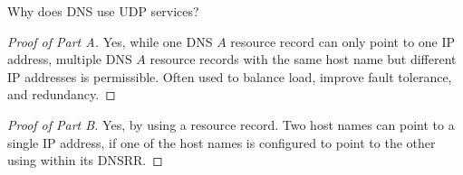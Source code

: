 \documentclass[../../main.tex]{subfiles}
\begin{document}
\begin{wts}
Why does DNS use UDP services? 
\end{wts}
\begin{proof}[Proof of Part A]
    Yes, while one DNS $A$ resource record can only point to one IP address, multiple DNS $A$ resource records with the same host name but different IP addresses is permissible. Often used to balance load, improve fault tolerance, and redundancy.
\end{proof}
\begin{proof}[Proof of Part B]
    Yes, by using a  resource record. Two host names can point to a single IP address, if one of the host names is configured to point to the other using  within its DNSRR.
\end{proof}
\end{document}
